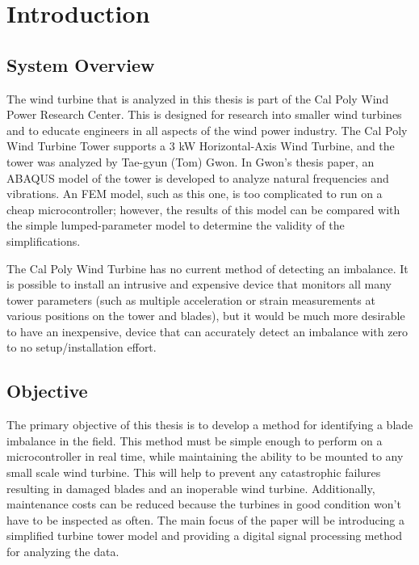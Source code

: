 \chapter{Introduction} %

\label{ch_introduction} %

\section{System Overview}

The wind turbine that is analyzed in this thesis is part of the Cal Poly Wind Power Research Center.  This is designed for research into smaller wind turbines and to educate engineers in all aspects of the wind power industry.  The Cal Poly Wind Turbine Tower supports a 3 kW Horizontal-Axis Wind Turbine, and the tower was analyzed by Tae-gyun (Tom) Gwon\cite{Gwon_paper}.  In Gwon’s thesis paper, an ABAQUS model of the tower is developed to analyze natural frequencies and vibrations.  An FEM model, such as this one, is too complicated to run on a cheap microcontroller; however, the results of this model can be compared with the simple lumped-parameter model to determine the validity of the simplifications.

The Cal Poly Wind Turbine has no current method of detecting an imbalance.  It is possible to install an intrusive and expensive device that monitors all many tower parameters (such as multiple acceleration or strain measurements at various positions on the tower and blades), but it would be much more desirable to have an inexpensive, device that can accurately detect an imbalance with zero to no setup/installation effort.


\section{Objective}

The primary objective of this thesis is to develop a method for identifying a blade imbalance in the field.  This method must be simple enough to perform on a microcontroller in real time, while maintaining the ability to be mounted to any small scale wind turbine.   This will help to prevent any catastrophic failures resulting in damaged blades and an inoperable wind turbine.  Additionally, maintenance costs can be reduced because the turbines in good condition won't have to be inspected as often.  The main focus of the paper will be introducing a simplified turbine tower model and providing a digital signal processing method for analyzing the data.

